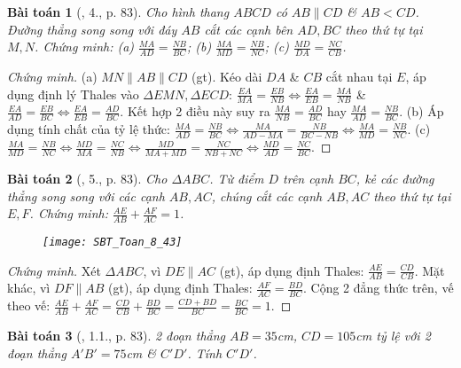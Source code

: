 \documentclass{article}
\newtheorem{baitoan}{Bài toán}
\begin{document}
\begin{baitoan}[\cite{SBT_Toan_8_tap_2}, 4., p. 83]
	Cho hình thang $ABCD$ có $AB\parallel CD$ \& $AB < CD$. Đường thẳng song song với đáy $AB$ cắt các cạnh bên $AD,BC$ theo thứ tự tại $M,N$. Chứng minh: (a) $\frac{MA}{AD} = \frac{NB}{BC}$; (b) $\frac{MA}{MD} = \frac{NB}{NC}$; (c) $\frac{MD}{DA} = \frac{NC}{CB}$.
\end{baitoan}

\begin{proof}[Chứng minh]
	(a) $MN\parallel AB\parallel CD$ (gt). Kéo dài $DA$ \& $CB$ cắt nhau tại $E$, áp dụng định lý Thales vào $\Delta EMN,\Delta ECD$: $\frac{EA}{MA} = \frac{EB}{NB}\Leftrightarrow\frac{EA}{EB} = \frac{MA}{NB}$ \& $\frac{EA}{AD} = \frac{EB}{BC}\Leftrightarrow\frac{EA}{EB} = \frac{AD}{BC}$. Kết hợp 2 điều này suy ra $\frac{MA}{NB} = \frac{AD}{BC}$ hay $\frac{MA}{AD} = \frac{NB}{BC}$. (b) Áp dụng tính chất của tỷ lệ thức: $\frac{MA}{AD} = \frac{NB}{BC}\Leftrightarrow\frac{MA}{AD - MA} = \frac{NB}{BC - NB}\Leftrightarrow\frac{MA}{MD} = \frac{NB}{NC}$. (c) $\frac{MA}{MD} = \frac{NB}{NC}\Leftrightarrow\frac{MD}{MA} = \frac{NC}{NB}\Leftrightarrow\frac{MD}{MA + MD} = \frac{NC}{NB + NC}\Leftrightarrow\frac{MD}{AD} = \frac{NC}{BC}$.
\end{proof}

\begin{baitoan}[\cite{SBT_Toan_8_tap_2}, 5., p. 83]
	\label{SBT_Toan_8_tap_2 5. p. 83}
	Cho $\Delta ABC$. Từ điểm $D$ trên cạnh $BC$, kẻ các đường thẳng song song với các cạnh $AB,AC$, chúng cắt các cạnh $AB,AC$ theo thứ tự tại $E,F$. Chứng minh: $\frac{AE}{AB} + \frac{AF}{AC} = 1$.
	\begin{figure}[H]
		\centering
		\texttt{[image: SBT\_Toan\_8\_43]}
	\end{figure}
\end{baitoan}

\begin{proof}[Chứng minh]
	
	Xét $\Delta ABC$, vì $DE\parallel AC$ (gt), áp dụng định Thales: $\frac{AE}{AB} = \frac{CD}{CB}$. Mặt khác, vì $DF\parallel AB$ (gt), áp dụng định Thales: $\frac{AF}{AC} = \frac{BD}{BC}$. Cộng 2 đẳng thức trên, vế theo vế: $\frac{AE}{AB} + \frac{AF}{AC} = \frac{CD}{CB} + \frac{BD}{BC} = \frac{CD + BD}{BC} = \frac{BC}{BC} = 1$.
\end{proof}

\begin{baitoan}[\cite{SBT_Toan_8_tap_2}, 1.1., p. 83]
	2 đoạn thẳng $AB = 35$\emph{cm}, $CD = 105$\emph{cm} tỷ lệ với 2 đoạn thẳng $A'B' = 75$\emph{cm} \& $C'D'$. Tính $C'D'$.
\end{baitoan}
\end{document}
